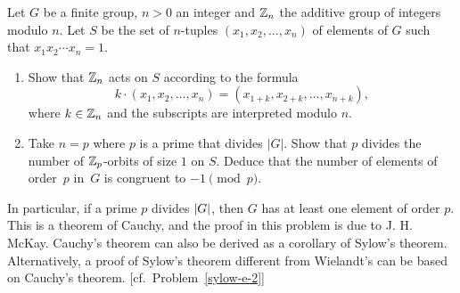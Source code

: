 \begin{probl}\label{cauchy}
    Let $G$ be a finite group, $n > 0$ an integer and\/ $\mathbb{Z}_n$ the additive group of integers modulo $n$. Let $S$ be the set of $n$-tuples $(x_1, x_2, ..., x_n)$ of elements of\/ $G$ such that $x_1x_2\cdots x_n = 1$.
    \begin{enumerate}[\upshape a)]
        \item Show that $\mathbb{Z}_n$ acts on $S$ according to the formula
        $$
            k\cdot(x_1, x_2, \dots, x_n) = (x_{1+k}, x_{2+k}, \dots, x_{n+k}),
        $$
        where $k\in\mathbb{Z}_n$ and the subscripts are interpreted modulo $n$.

        \item Take $n = p$ where $p$ is a prime that divides $|G|$. Show that $p$ divides the number of\/ $\mathbb{Z}_p$-orbits of size $1$ on\/ $S$. Deduce that the number of elements of order\/~$p$ in\/~$G$ is congruent to $-1 \pmod{p}$.
    \end{enumerate}
    
    \textrm{ In particular, if a prime $p$ divides $\left\vert{G}\right\vert$, then $G$ has at least one element of order $p$. This is a theorem of Cauchy, and the proof in this problem is due to J. H. McKay. Cauchy's theorem can also be derived as a corollary of Sylow's theorem. Alternatively, a proof of Sylow's theorem different from Wielandt's can be based on Cauchy's theorem. [cf.~Problem~\ref{sylow-e-2}]}
\end{probl}

